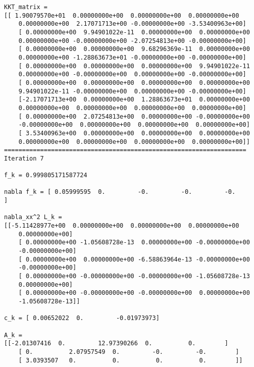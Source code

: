 \documentclass{article}
\begin{document}
\begin{verbatim}
KKT_matrix = 
[[ 1.90079570e+01  0.00000000e+00  0.00000000e+00  0.00000000e+00
    0.00000000e+00  2.17071713e+00 -0.00000000e+00 -3.53400963e+00]
    [ 0.00000000e+00  9.94901022e-11  0.00000000e+00  0.00000000e+00
    0.00000000e+00 -0.00000000e+00 -2.07254813e+00 -0.00000000e+00]
    [ 0.00000000e+00  0.00000000e+00  9.68296369e-11  0.00000000e+00
    0.00000000e+00 -1.28863673e+01 -0.00000000e+00 -0.00000000e+00]
    [ 0.00000000e+00  0.00000000e+00  0.00000000e+00  9.94901022e-11
    0.00000000e+00 -0.00000000e+00  0.00000000e+00 -0.00000000e+00]
    [ 0.00000000e+00  0.00000000e+00  0.00000000e+00  0.00000000e+00
    9.94901022e-11 -0.00000000e+00  0.00000000e+00 -0.00000000e+00]
    [-2.17071713e+00  0.00000000e+00  1.28863673e+01  0.00000000e+00
    0.00000000e+00  0.00000000e+00  0.00000000e+00  0.00000000e+00]
    [ 0.00000000e+00  2.07254813e+00  0.00000000e+00 -0.00000000e+00
    -0.00000000e+00  0.00000000e+00  0.00000000e+00  0.00000000e+00]
    [ 3.53400963e+00  0.00000000e+00  0.00000000e+00  0.00000000e+00
    0.00000000e+00  0.00000000e+00  0.00000000e+00  0.00000000e+00]]
===================================================================
Iteration 7

f_k = 0.999805171587724

nabla f_k = [ 0.05999595  0.         -0.         -0.         -0.        ]

nabla_xx^2 L_k = 
[[-5.11428977e+00  0.00000000e+00  0.00000000e+00  0.00000000e+00
    0.00000000e+00]
    [ 0.00000000e+00 -1.05608728e-13  0.00000000e+00 -0.00000000e+00
    -0.00000000e+00]
    [ 0.00000000e+00  0.00000000e+00 -6.58863964e-13 -0.00000000e+00
    -0.00000000e+00]
    [ 0.00000000e+00 -0.00000000e+00 -0.00000000e+00 -1.05608728e-13
    0.00000000e+00]
    [ 0.00000000e+00 -0.00000000e+00 -0.00000000e+00  0.00000000e+00
    -1.05608728e-13]]

c_k = [ 0.00652022  0.         -0.01973973]

A_k = 
[[-2.01307416  0.         12.97390266  0.          0.        ]
    [ 0.          2.07957549  0.         -0.         -0.        ]
    [ 3.0393507   0.          0.          0.          0.        ]]


\end{verbatim}
\end{document}
